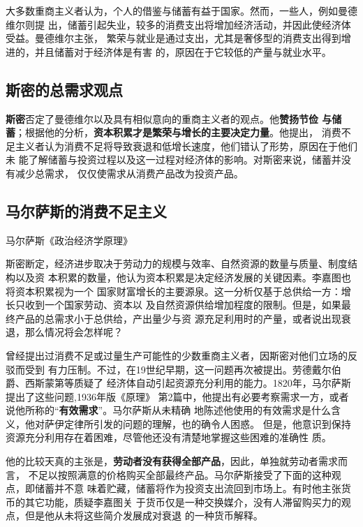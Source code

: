大多数重商主义者认为，个人的借鉴与储蓄有益于国家。然而，一些人，例如曼德维尔则提
出，储蓄引起失业，较多的消费支出将增加经济活动，并因此使经济体受益。曼德维尔主张，
繁荣与就业是通过支出，尤其是奢侈型的消费支出得到增进的，并且储蓄对于经济体是有害
的，原因在于它较低的产量与就业水平。

\subsection{斯密的总需求观点}

\textbf{斯密}否定了曼德维尔以及具有相似意向的重商主义者的观点。他\textbf{赞扬节俭
  与储蓄}；根据他的分析，\textbf{资本积累才是繁荣与增长的主要决定力量}。他提出，
消费不足主义者认为消费不足将导致衰退和低增长速度，他们错认了形势，原因在于他们未
能了解储蓄与投资过程以及这一过程对经济体的影响。对斯密来说，储蓄并没有减少总需求，
仅仅使需求从消费产品改为投资产品。

\subsection{马尔萨斯的消费不足主义}

马尔萨斯《政治经济学原理》

斯密断定，经济进步取决于劳动力的规模与效率、自然资源的数量与质量、制度结构以及资
本积累的数量，他认为资本积累是决定经济发展的关键因素。李嘉图也将资本积累视为一个
国家财富增长的主要源泉。这一分析仅基于总供给一方：增长只收到一个国家劳动、资本以
及自然资源供给增加程度的限制。但是，如果最终产品的总需求小于总供给，产出量少与资
源充足利用时的产量，或者说出现衰退，那么情况将会怎样呢？

曾经提出过消费不足或过量生产可能性的少数重商主义者，因斯密对他们立场的反驳而受到
有力压制。不过，在19世纪早期，这一问题再次被提出。劳德戴尔伯爵、西斯蒙第等质疑了
经济体自动引起资源充分利用的能力。1820年，马尔萨斯提出了这些问题,1936年版《原理》
第2篇中，他提出有必要考察需求一方，或者说他所称的“\textbf{有效需求}”。马尔萨斯从未精确
地陈述他使用的有效需求是什么含义，他对萨伊定律所引发的问题的理解，也的确令人困惑。
但是，他意识到保持资源充分利用存在着困难，尽管他还没有清楚地掌握这些困难的准确性
质。

他的比较天真的主张是，\textbf{劳动者没有获得全部产品}，因此，单独就劳动者需求而言，
不足以按照满意的价格购买全部最终产品。马尔萨斯接受了下面的这种观点，即储蓄并不意
味着贮藏，储蓄将作为投资支出流回到市场上。有时他主张货币的其它功能，质疑李嘉图关
于货币仅是一种交换媒介，没有人滞留购买力的观点，但是他从未将这些简介发展成对衰退
的一种货币解释。

